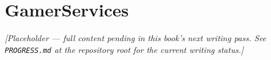 \chapter{GamerServices}
\label{ch:gamerservices}

\emph{[Placeholder --- full content pending in this book's next writing pass. See \texttt{PROGRESS.md} at the repository root for the current writing status.]}
